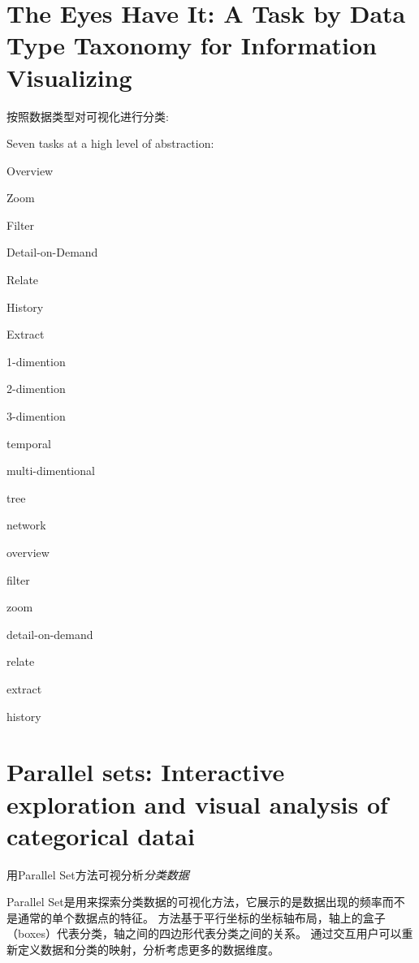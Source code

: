 \documentclass{article}
\begin{document}
\normalem
\section{The Eyes Have It: A Task by Data Type Taxonomy
	for Information Visualizing\cite{shneiderman1996eyes}}

	按照数据类型对可视化进行分类:

	Seven tasks at a high level of abstraction:\\
	\begin{inparaenum}[\itshape 1)]
		\item Overview
		\item	Zoom
		\item	Filter
		\item	Detail-on-Demand
		\item	Relate
		\item	History
		\item	Extract
	\end{inparaenum}

	\begin{inparaenum}[\itshape 1)]
		\item 1-dimention
		\item 2-dimention
		\item 3-dimention
		\item temporal
		\item multi-dimentional
		\item tree
		\item network
		\item overview
		\item filter
		\item zoom
		\item detail-on-demand
		\item relate
		\item extract
		\item history
	\end{inparaenum}



\section{Parallel sets: Interactive exploration and
	visual analysis of categorical datai\cite{kosara2006parallel}}

	用Parallel Set方法可视分析\emph{分类数据}

	Parallel Set是用来探索分类数据的可视化方法，它展示的是数据出现的频率而不是通常的单个数据点的特征。
	方法基于平行坐标的坐标轴布局，轴上的盒子（boxes）代表分类，轴之间的四边形代表分类之间的关系。
	通过交互用户可以重新定义数据和分类的映射，分析考虑更多的数据维度。
\end{document}
